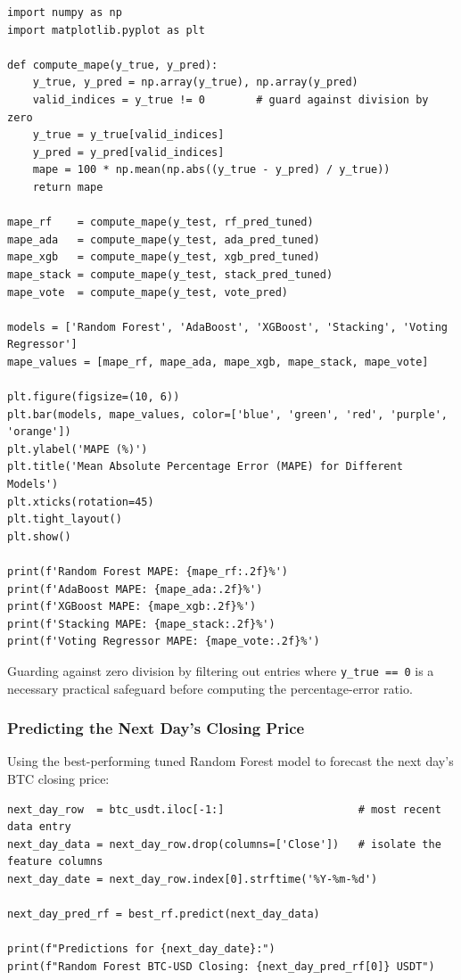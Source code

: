 \documentclass[12pt,openany]{book}
\begin{document}
\begin{Verbatim}[breaklines=true,breakanywhere=true,fontsize=\small]
import numpy as np
import matplotlib.pyplot as plt

def compute_mape(y_true, y_pred):
    y_true, y_pred = np.array(y_true), np.array(y_pred)
    valid_indices = y_true != 0        # guard against division by zero
    y_true = y_true[valid_indices]
    y_pred = y_pred[valid_indices]
    mape = 100 * np.mean(np.abs((y_true - y_pred) / y_true))
    return mape

mape_rf    = compute_mape(y_test, rf_pred_tuned)
mape_ada   = compute_mape(y_test, ada_pred_tuned)
mape_xgb   = compute_mape(y_test, xgb_pred_tuned)
mape_stack = compute_mape(y_test, stack_pred_tuned)
mape_vote  = compute_mape(y_test, vote_pred)

models = ['Random Forest', 'AdaBoost', 'XGBoost', 'Stacking', 'Voting Regressor']
mape_values = [mape_rf, mape_ada, mape_xgb, mape_stack, mape_vote]

plt.figure(figsize=(10, 6))
plt.bar(models, mape_values, color=['blue', 'green', 'red', 'purple', 'orange'])
plt.ylabel('MAPE (%)')
plt.title('Mean Absolute Percentage Error (MAPE) for Different Models')
plt.xticks(rotation=45)
plt.tight_layout()
plt.show()

print(f'Random Forest MAPE: {mape_rf:.2f}%')
print(f'AdaBoost MAPE: {mape_ada:.2f}%')
print(f'XGBoost MAPE: {mape_xgb:.2f}%')
print(f'Stacking MAPE: {mape_stack:.2f}%')
print(f'Voting Regressor MAPE: {mape_vote:.2f}%')
\end{Verbatim}

Guarding against zero division by filtering out entries where \texttt{y\_true == 0} is a necessary practical safeguard before computing the percentage-error ratio.

\subsubsection{Predicting the Next Day's Closing Price}

Using the best-performing tuned Random Forest model to forecast the next day's BTC closing price:

\begin{Verbatim}[breaklines=true,breakanywhere=true,fontsize=\small]
next_day_row  = btc_usdt.iloc[-1:]                     # most recent data entry
next_day_data = next_day_row.drop(columns=['Close'])   # isolate the feature columns
next_day_date = next_day_row.index[0].strftime('%Y-%m-%d')

next_day_pred_rf = best_rf.predict(next_day_data)

print(f"Predictions for {next_day_date}:")
print(f"Random Forest BTC-USD Closing: {next_day_pred_rf[0]} USDT")
\end{Verbatim}
\end{document}
